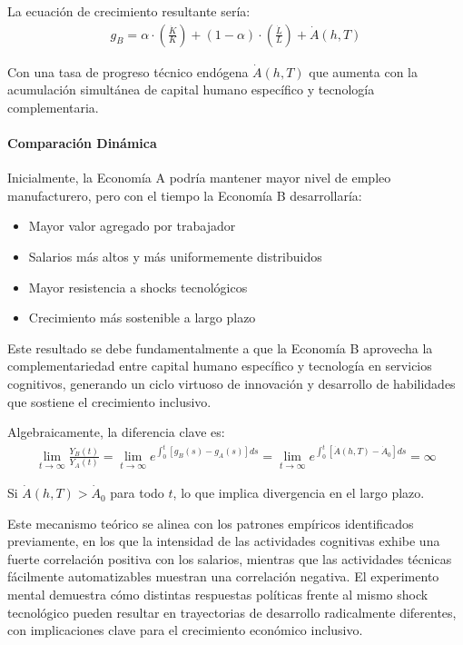 \documentclass{article}
\theoremstyle{remark}
\theoremstyle{definition}
\begin{document}
\begin{tcolorbox}
La ecuación de crecimiento resultante sería:
\begin{align}
g_B = \alpha \cdot \left( \frac{\dot{K}}{K} \right) + (1-\alpha) \cdot \left( \frac{\dot{L}}{L} \right) + \dot{A}(h,T)
\end{align}

Con una tasa de progreso técnico endógena $\dot{A}(h,T)$ que aumenta con la acumulación simultánea de capital humano específico y tecnología complementaria.

\paragraph{Comparación Dinámica}
Inicialmente, la Economía A podría mantener mayor nivel de empleo manufacturero, pero con el tiempo la Economía B desarrollaría:
\begin{itemize}
\item Mayor valor agregado por trabajador
\item Salarios más altos y más uniformemente distribuidos
\item Mayor resistencia a shocks tecnológicos
\item Crecimiento más sostenible a largo plazo
\end{itemize}

Este resultado se debe fundamentalmente a que la Economía B aprovecha la complementariedad entre capital humano específico y tecnología en servicios cognitivos, generando un ciclo virtuoso de innovación y desarrollo de habilidades que sostiene el crecimiento inclusivo.

Algebraicamente, la diferencia clave es:
\begin{align}
\lim_{t \to \infty} \frac{Y_B(t)}{Y_A(t)} = \lim_{t \to \infty} e^{\int_0^t [g_B(s) - g_A(s)] ds} = \lim_{t \to \infty} e^{\int_0^t [\dot{A}(h,T) - \dot{A}_0] ds} = \infty
\end{align}

Si $\dot{A}(h,T) > \dot{A}_0$ para todo $t$, lo que implica divergencia en el largo plazo.

Este mecanismo teórico se alinea con los patrones empíricos identificados previamente, en los que la intensidad de las actividades cognitivas exhibe una fuerte correlación positiva con los salarios, mientras que las actividades técnicas fácilmente automatizables muestran una correlación negativa. El experimento mental demuestra cómo distintas respuestas políticas frente al mismo shock tecnológico pueden resultar en trayectorias de desarrollo radicalmente diferentes, con implicaciones clave para el crecimiento económico inclusivo.

\end{tcolorbox}
\end{document}
